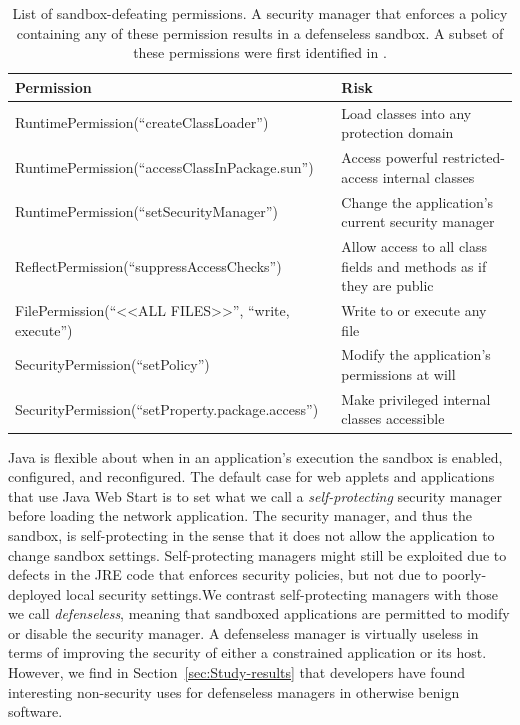 \documentclass{sig-alternate}
\begin{document}
\begin{table}
\caption{List of sandbox-defeating permissions. A security manager that enforces
a policy containing any of these permission results
\label{tab:defenseless-permissions}
in a defenseless sandbox. A subset of these permissions were first identified in \cite{security_explorations_2012}. 
}
\begin{tabular}{ll}
\toprule 
\textbf{Permission} & \textbf{Risk}\tabularnewline
\midrule
RuntimePermission(``createClassLoader'') & Load classes into any protection domain\tabularnewline
RuntimePermission(``accessClassInPackage.sun'') & Access powerful restricted-access internal classes\tabularnewline
RuntimePermission(``setSecurityManager'') & Change the application's current security manager\tabularnewline
ReflectPermission(``suppressAccessChecks'') & Allow access to all class fields and methods as if they are public\tabularnewline
FilePermission(``<\textcompwordmark{}<ALL FILES>\textcompwordmark{}>'',
``write, execute'') & Write to or execute any file\tabularnewline
SecurityPermission(``setPolicy'') & Modify the application's permissions at will\tabularnewline
SecurityPermission(``setProperty.package.access'') & Make privileged internal classes accessible\tabularnewline
\bottomrule
\end{tabular}
\vspace{-0.5cm}
\end{table}

Java is flexible about when in an application's execution the sandbox
is enabled, configured, and reconfigured. The default case for web applets and applications
that use Java Web Start is to set what we call a \textit{self-protecting} security
manager before loading the network application. The security
manager, and thus the sandbox, is self-protecting in the sense that
it does not allow the application to change sandbox settings. Self-protecting managers might
still be exploited due to defects in the JRE code that enforces security
policies, but not due to poorly-deployed local security settings.We contrast
self-protecting managers with those we call 
\textit{defenseless}, meaning that sandboxed applications are 
permitted to modify or disable the security manager.  
A defenseless manager is virtually useless in terms of improving the
security of either a constrained application or its host. However, we find
in Section~\ref{sec:Study-results} that developers
have found interesting non-security uses for defenseless managers in otherwise
benign software.
\end{document}
